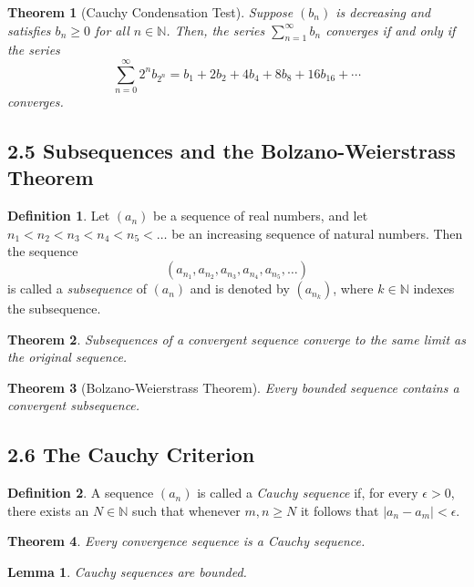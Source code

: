 \documentclass{amsart}
\newtheorem*{theorem}{Theorem}
\newtheorem*{lemma}{Lemma}
\theoremstyle{definition}
\newtheorem*{definition}{Definition}
\newcommand{\N}{\mathbb{N}}
\newcommand{\abs}[1]{|#1|}
\begin{document}
\begin{theorem}[Cauchy Condensation Test]
  Suppose $(b_n)$ is decreasing and satisfies $b_n \ge 0$ for all $n \in \N$.
  Then, the series $\sum_{n=1}^{\infty} b_n$ converges if and only if the series
  \[
    \sum_{n=0}^{\infty} 2^n b_{2^n} = b_1 + 2 b_2 + 4 b_4 + 8 b_8 + 16 b_{16} +
    \cdots
  \]
  converges.
\end{theorem}

\subsection*{2.5 Subsequences and the Bolzano-Weierstrass Theorem}

\begin{definition}
  Let $(a_n)$ be a sequence of real numbers, and let $n_1 < n_2 < n_3 < n_4 <
  n_5 < \ldots$ be an increasing sequence of natural numbers. Then the sequence
  \[
    (a_{n_1}, a_{n_2}, a_{n_3}, a_{n_4}, a_{n_5}, \ldots)
  \]
  is called a \emph{subsequence} of $(a_n)$ and is denoted by $(a_{n_k})$, where
  $k \in \N$ indexes the subsequence.
\end{definition}

\begin{theorem}
  Subsequences of a convergent sequence converge to the same limit as the
  original sequence.
\end{theorem}

\begin{theorem}[Bolzano-Weierstrass Theorem]
  Every bounded sequence contains a convergent subsequence.
\end{theorem}

\subsection*{2.6 The Cauchy Criterion}

\begin{definition}
  A sequence $(a_n)$ is called a \emph{Cauchy sequence} if, for every $\epsilon
  > 0$, there exists an $N \in \N$ such that whenever $m, n \ge N$ it follows
  that $\abs{a_n - a_m} < \epsilon$.
\end{definition}

\begin{theorem}
  Every convergence sequence is a Cauchy sequence.
\end{theorem}

\begin{lemma}
  Cauchy sequences are bounded.
\end{lemma}
\end{document}

